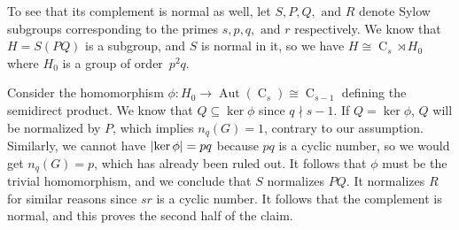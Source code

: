 \documentclass[a4paper, 12pt]{article}
\DeclarePairedDelimiter\abs{\lvert}{\rvert}
\newcommand{\aut}[1]{\operatorname{Aut}(#1)}
\newcommand{\cyc}[1]{\operatorname{C}_{#1}}
\theoremstyle{plain}
\theoremstyle{definition}
\begin{document}
To see that its complement is normal as well, let $S, P, Q,\text{ and }R$ denote Sylow subgroups corresponding to the primes $s, p, q,\text{ and }r$ respectively. We know that $H = S(PQ)$ is a subgroup, and $S$ is normal in it, so we have $H \cong \cyc{s} \rtimes H_0$ where $H_0$ is a group of \mbox{order $p^2 q$.}

Consider the homomorphism $\phi : H_0 \rightarrow \aut{\cyc{s}} \cong \cyc{s - 1}$ defining the semidirect product. We know that $Q \subseteq \ker \phi$ since $q \nmid s - 1$. If $Q = \ker \phi$, $Q$ will be normalized by $P$, which implies $n_q(G) = 1$, contrary to our assumption. Similarly, we cannot have $\abs{\ker \phi} = pq$ because $pq$ is a cyclic number, so we would get $n_q(G) = p$, which has already been ruled out. It follows that $\phi$ must be the trivial homomorphism, and we conclude that $S$ normalizes $PQ$. It normalizes $R$ for similar reasons since $sr$ is a cyclic number.  It follows that the complement is normal, and this proves the second half of the claim.
\end{document}
